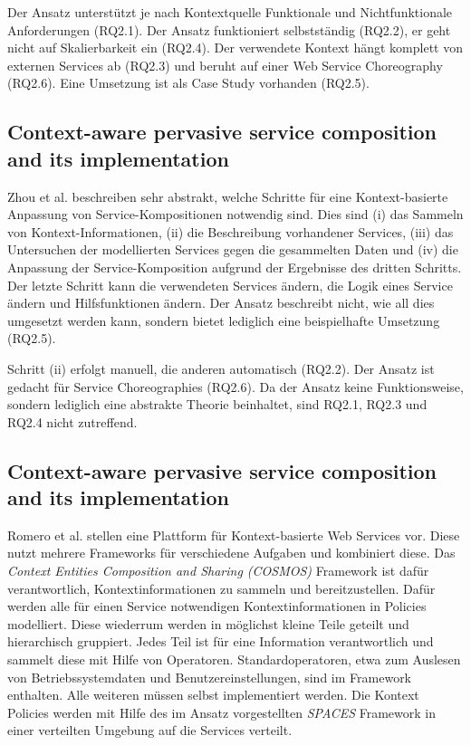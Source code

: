 \documentclass[conference,compsoc,ngerman]{IEEEtran}
\begin{document}
Der Ansatz unterstützt je nach Kontextquelle Funktionale und Nichtfunktionale Anforderungen (RQ2.1). Der Ansatz funktioniert selbstständig (RQ2.2), er geht nicht auf Skalierbarkeit ein (RQ2.4). Der verwendete Kontext hängt komplett von externen Services ab (RQ2.3) und beruht auf einer Web Service Choreography (RQ2.6). Eine Umsetzung ist als Case Study vorhanden (RQ2.5).

\subsection{Context-aware pervasive service composition and its implementation}
Zhou et al. \cite{ZGP11} beschreiben sehr abstrakt, welche Schritte für eine Kontext-basierte Anpassung von Service-Kompositionen notwendig sind. Dies sind (i) das Sammeln von Kontext-Informationen, (ii) die Beschreibung vorhandener Services, (iii) das Untersuchen der modellierten Services gegen die gesammelten Daten und (iv) die Anpassung der Service-Komposition aufgrund der Ergebnisse des dritten Schritts. Der letzte Schritt kann die verwendeten Services ändern, die Logik eines Service ändern und Hilfsfunktionen ändern. Der Ansatz beschreibt nicht, wie all dies umgesetzt werden kann, sondern bietet lediglich eine beispielhafte Umsetzung (RQ2.5).

Schritt (ii) erfolgt manuell, die anderen automatisch (RQ2.2). Der Ansatz ist gedacht für Service Choreographies (RQ2.6). Da der Ansatz keine Funktionsweise, sondern lediglich eine abstrakte Theorie beinhaltet, sind RQ2.1, RQ2.3 und RQ2.4 nicht zutreffend.

\subsection{Context-aware pervasive service composition and its implementation}
Romero et al. \cite{RRS10} stellen eine Plattform für Kontext-basierte Web Services vor. Diese nutzt mehrere Frameworks für verschiedene Aufgaben und kombiniert diese. Das \textit{Context Entities Composition and Sharing (COSMOS)} Framework \cite{RCS08} ist dafür verantwortlich, Kontextinformationen zu sammeln und bereitzustellen. Dafür werden alle für einen Service notwendigen Kontextinformationen in Policies modelliert. Diese wiederrum werden in möglichst kleine Teile geteilt und hierarchisch gruppiert. Jedes Teil ist für eine Information verantwortlich und sammelt diese mit Hilfe von Operatoren. Standardoperatoren, etwa zum Auslesen von Betriebssystemdaten und Benutzereinstellungen, sind im Framework enthalten. Alle weiteren müssen selbst implementiert werden. Die Kontext Policies werden mit Hilfe des im Ansatz vorgestellten \textit{SPACES} Framework \cite{SMF09} in einer verteilten Umgebung auf die Services verteilt.
\end{document}
